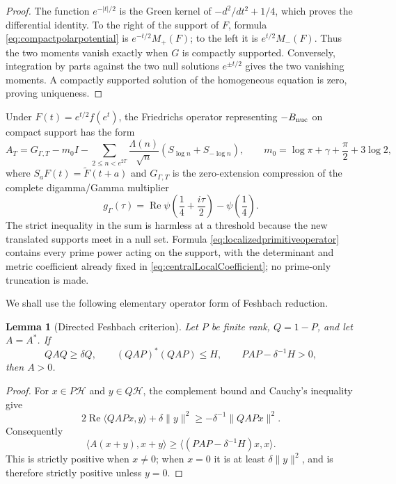 \documentclass[11pt]{amsart}
\newtheorem{lemma}[theorem]{Lemma}
\theoremstyle{definition}
\theoremstyle{remark}
\begin{document}
\begin{proof}
The function \(e^{-|t|/2}\) is the Green kernel of
\(-d^2/dt^2+1/4\), which proves the differential identity.  To the right
of the support of \(F\), formula \eqref{eq:compactpolarpotential} is
\(e^{-t/2}M_+(F)\); to the left it is \(e^{t/2}M_-(F)\).  Thus the
two moments vanish exactly when \(G\) is compactly supported.  Conversely,
integration by parts against the two null solutions \(e^{\pm t/2}\) gives
the two vanishing moments.  A compactly supported solution of the
homogeneous equation is zero, proving uniqueness.
\end{proof}

Under \(F(t)=e^{t/2}f(e^t)\), the Friedrichs operator representing
\(-B_{\rm nuc}\) on compact support has the form
\begin{equation}\label{eq:localizedprimitiveoperator}
 A_T=G_{\Gamma,T}-m_0I-
 \sum_{2\le n<e^{2T}}\frac{\Lambda(n)}{\sqrt n}
       (S_{\log n}+S_{-\log n}),
 \qquad
 m_0=\log\pi+\gamma+\frac{\pi}{2}+3\log2,
\end{equation}
where \(S_aF(t)=\widetilde F(t+a)\) and \(G_{\Gamma,T}\) is the
zero-extension compression of the complete digamma/Gamma multiplier
\[
 g_\Gamma(\tau)=\operatorname {Re}\psi
       \left(\frac14+\frac{i\tau}{2}\right)-\psi\left(\frac14\right).
\]
The strict inequality in the sum is harmless at a threshold because the
new translated supports meet in a null set.  Formula
\eqref{eq:localizedprimitiveoperator} contains every prime power acting on
the support, with the determinant and metric coefficient already fixed in
\eqref{eq:centralLocalCoefficient}; no prime-only truncation is made.

We shall use the following elementary operator form of Feshbach reduction.

\begin{lemma}[Directed Feshbach criterion]\label{lem:directedFeshbach}
Let \(P\) be finite rank, \(Q=1-P\), and let \(A=A^*\).  If
\begin{equation}\label{eq:directedFeshbachHypotheses}
 QAQ\ge\delta Q,\qquad
 (QAP)^*(QAP)\le H,\qquad
 PAP-\delta^{-1}H>0,
\end{equation}
then \(A>0\).
\end{lemma}

\begin{proof}
For \(x\in P\mathcal H\) and \(y\in Q\mathcal H\), the complement bound
and Cauchy's inequality give
\[
 2\operatorname{Re}\langle QAPx,y\rangle+\delta\|y\|^2
 \ge-\delta^{-1}\|QAPx\|^2.
\]
Consequently
\[
 \langle A(x+y),x+y\rangle
 \ge \langle(PAP-\delta^{-1}H)x,x\rangle.
\]
This is strictly positive when \(x\ne0\); when \(x=0\) it is at least
\(\delta\|y\|^2\), and is therefore strictly positive unless \(y=0\).
\end{proof}
\end{document}
